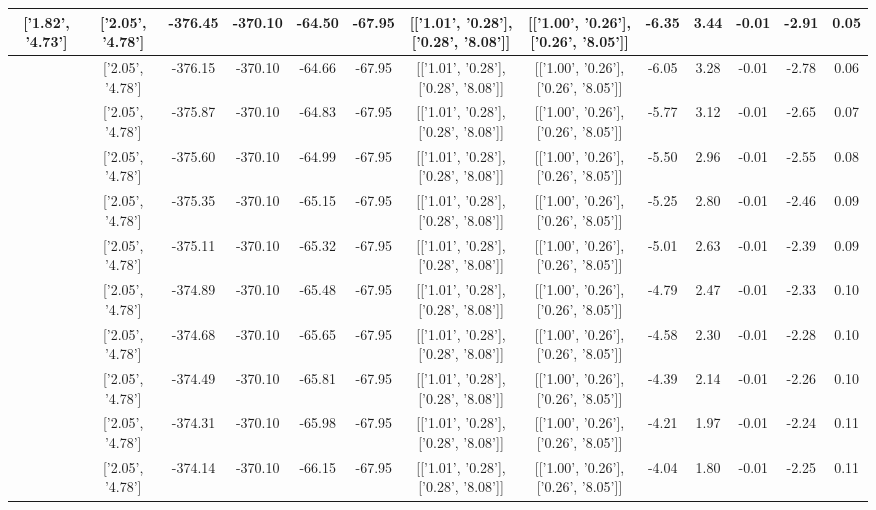 \begin{table}[htbp]
\begin{adjustbox}{angle=90}
\begin{tabular}{|c|c|c|c|c|c|c|c|c|c|c|c|c|}
 ['1.82', '4.73'] & ['2.05', '4.78'] & -376.45 & -370.10 & -64.50 & -67.95 & [['1.01', '0.28'], ['0.28', '8.08']] & [['1.00', '0.26'], ['0.26', '8.05']] & -6.35 & 3.44 & -0.01 & -2.91 & 0.05\\ \hline
 ['1.83', '4.74'] & ['2.05', '4.78'] & -376.15 & -370.10 & -64.66 & -67.95 & [['1.01', '0.28'], ['0.28', '8.08']] & [['1.00', '0.26'], ['0.26', '8.05']] & -6.05 & 3.28 & -0.01 & -2.78 & 0.06\\ \hline
 ['1.84', '4.74'] & ['2.05', '4.78'] & -375.87 & -370.10 & -64.83 & -67.95 & [['1.01', '0.28'], ['0.28', '8.08']] & [['1.00', '0.26'], ['0.26', '8.05']] & -5.77 & 3.12 & -0.01 & -2.65 & 0.07\\ \hline
 ['1.85', '4.74'] & ['2.05', '4.78'] & -375.60 & -370.10 & -64.99 & -67.95 & [['1.01', '0.28'], ['0.28', '8.08']] & [['1.00', '0.26'], ['0.26', '8.05']] & -5.50 & 2.96 & -0.01 & -2.55 & 0.08\\ \hline
 ['1.86', '4.74'] & ['2.05', '4.78'] & -375.35 & -370.10 & -65.15 & -67.95 & [['1.01', '0.28'], ['0.28', '8.08']] & [['1.00', '0.26'], ['0.26', '8.05']] & -5.25 & 2.80 & -0.01 & -2.46 & 0.09\\ \hline
 ['1.87', '4.75'] & ['2.05', '4.78'] & -375.11 & -370.10 & -65.32 & -67.95 & [['1.01', '0.28'], ['0.28', '8.08']] & [['1.00', '0.26'], ['0.26', '8.05']] & -5.01 & 2.63 & -0.01 & -2.39 & 0.09\\ \hline
 ['1.89', '4.75'] & ['2.05', '4.78'] & -374.89 & -370.10 & -65.48 & -67.95 & [['1.01', '0.28'], ['0.28', '8.08']] & [['1.00', '0.26'], ['0.26', '8.05']] & -4.79 & 2.47 & -0.01 & -2.33 & 0.10\\ \hline
 ['1.90', '4.75'] & ['2.05', '4.78'] & -374.68 & -370.10 & -65.65 & -67.95 & [['1.01', '0.28'], ['0.28', '8.08']] & [['1.00', '0.26'], ['0.26', '8.05']] & -4.58 & 2.30 & -0.01 & -2.28 & 0.10\\ \hline
 ['1.91', '4.75'] & ['2.05', '4.78'] & -374.49 & -370.10 & -65.81 & -67.95 & [['1.01', '0.28'], ['0.28', '8.08']] & [['1.00', '0.26'], ['0.26', '8.05']] & -4.39 & 2.14 & -0.01 & -2.26 & 0.10\\ \hline
 ['1.92', '4.76'] & ['2.05', '4.78'] & -374.31 & -370.10 & -65.98 & -67.95 & [['1.01', '0.28'], ['0.28', '8.08']] & [['1.00', '0.26'], ['0.26', '8.05']] & -4.21 & 1.97 & -0.01 & -2.24 & 0.11\\ \hline
 ['1.93', '4.76'] & ['2.05', '4.78'] & -374.14 & -370.10 & -66.15 & -67.95 & [['1.01', '0.28'], ['0.28', '8.08']] & [['1.00', '0.26'], ['0.26', '8.05']] & -4.04 & 1.80 & -0.01 & -2.25 & 0.11\\ \hline

\end{tabular}
\end{adjustbox}
\end{table}
